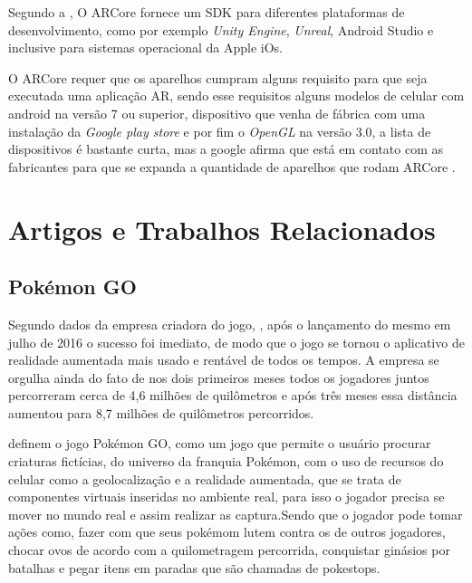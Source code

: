 		Segundo a , O ARCore fornece um SDK para diferentes plataformas de desenvolvimento, como por exemplo \textit{Unity Engine}, \textit{Unreal}, Android Studio e inclusive para sistemas operacional da Apple iOs.
		
		O ARCore requer que os aparelhos cumpram alguns requisito para que seja executada uma aplicação AR, sendo esse requisitos alguns modelos de celular com android na versão 7 ou superior, dispositivo que venha de fábrica com uma instalação da \textit{Google play store} e por fim o \textit{OpenGL} na versão 3.0, a lista de dispositivos é bastante curta, mas a google afirma que está em contato com as fabricantes para que se expanda a quantidade de aparelhos que rodam ARCore \cite{google:2018}.

\section{Artigos e Trabalhos Relacionados}	

	\subsection{Pokémon GO}
	Segundo dados da empresa criadora do jogo, , após o lançamento do mesmo em julho de 2016 o sucesso foi imediato, de modo que o jogo se tornou o aplicativo de realidade aumentada mais usado e rentável de todos os tempos. A empresa se orgulha ainda do fato de nos dois primeiros meses todos os jogadores juntos percorreram cerca de 4,6 milhões de quilômetros e após três meses essa distância aumentou para 8,7 milhões de quilômetros percorridos.
	
	 definem o jogo Pokémon GO, como um jogo que permite o usuário procurar criaturas fictícias, do universo da franquia Pokémon, com o uso de recursos do celular como a geolocalização e a realidade aumentada, que se trata de componentes virtuais inseridas no ambiente real, para isso o jogador precisa se mover no mundo real e assim realizar as captura.Sendo que o jogador pode tomar ações como, fazer com que seus pokémom lutem contra os de outros jogadores, chocar ovos de acordo com a quilometragem percorrida, conquistar ginásios por batalhas e pegar itens em paradas que são chamadas de pokestops. 
	
